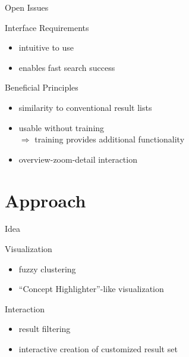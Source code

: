 \documentclass{beamer}
\begin{document}
\begin{frame}{Open Issues}
	\begin{beamerboxesrounded}[shadow=true]{Interface Requirements}
		\begin{itemize}
			\item intuitive to use
			\item enables fast search success
		\end{itemize}
	\end{beamerboxesrounded}
	\vspace{5mm} \pause
	\begin{beamerboxesrounded}[shadow=true]{Beneficial Principles}
		\begin{itemize}
			\item similarity to conventional result lists
			\item usable without training \\
						$\Rightarrow$ training provides additional functionality
			\item overview-zoom-detail interaction
		\end{itemize}
	\end{beamerboxesrounded}
\end{frame}

\section{Approach}
\begin{frame}{Idea}
	\begin{beamerboxesrounded}[shadow=true]{Visualization}
		\begin{itemize}
			\item fuzzy clustering
			\item ``Concept Highlighter''-like visualization
		\end{itemize}
	\end{beamerboxesrounded}
	\vspace{5mm} \pause
	\begin{beamerboxesrounded}[shadow=true]{Interaction}
		\begin{itemize}
			\item result filtering
			\item interactive creation of customized result set
		\end{itemize}
	\end{beamerboxesrounded}	
\end{frame}
\end{document}
